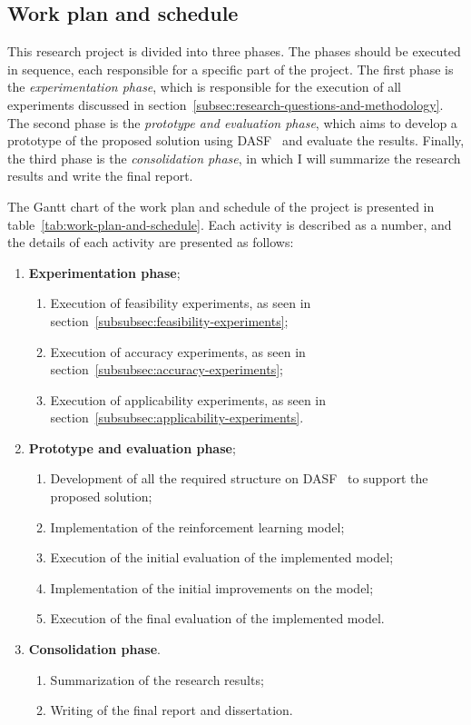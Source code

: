 \subsection{Work plan and schedule}
\label{subsec:work-plan-and-schedule}

This research project is divided into three phases.
The phases should be executed in sequence, each responsible for a specific part of the project.
The first phase is the \emph{experimentation phase}, which is responsible for the execution of all experiments discussed in section~\ref{subsec:research-questions-and-methodology}.
The second phase is the \emph{prototype and evaluation phase}, which aims to develop a prototype of the proposed solution using \ac{DASF}~\cite{dasf} and evaluate the results.
Finally, the third phase is the \emph{consolidation phase}, in which I will summarize the research results and write the final report.

The Gantt chart of the work plan and schedule of the project is presented in table~\ref{tab:work-plan-and-schedule}.
Each activity is described as a number, and the details of each activity are presented as follows:

\begin{enumerate}
  \item \textbf{Experimentation phase};
    \begin{enumerate}
      \item Execution of feasibility experiments, as seen in section~\ref{subsubsec:feasibility-experiments};
      \item Execution of accuracy experiments, as seen in section~\ref{subsubsec:accuracy-experiments};
      \item Execution of applicability experiments, as seen in section~\ref{subsubsec:applicability-experiments}.
    \end{enumerate}
  \item \textbf{Prototype and evaluation phase};
    \begin{enumerate}
      \item Development of all the required structure on \ac{DASF}~\cite{dasf} to support the proposed solution;
      \item Implementation of the reinforcement learning model;
      \item Execution of the initial evaluation of the implemented model;
      \item Implementation of the initial improvements on the model;
      \item Execution of the final evaluation of the implemented model.
    \end{enumerate}
  \item \textbf{Consolidation phase}.
    \begin{enumerate}
      \item Summarization of the research results;
      \item Writing of the final report and dissertation.
    \end{enumerate}
\end{enumerate}

